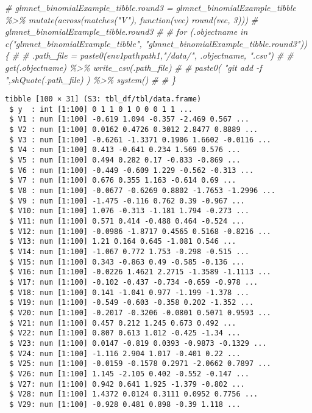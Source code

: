 \documentclass[
]{article}
\newenvironment{Shaded}{\begin{snugshade}}{\end{snugshade}}
\newcommand{\CommentTok}[1]{\textcolor[rgb]{0.56,0.35,0.01}{\textit{#1}}}
\begin{document}
\begin{Shaded}
\begin{Highlighting}[]
\CommentTok{\# glmnet\_binomialExample\_tibble.round3 = glmnet\_binomialExample\_tibble \%\textgreater{}\% mutate(across(matches("V"), function(vec) round(vec, 3)))}
\CommentTok{\# glmnet\_binomialExample\_tibble.round3}
\CommentTok{\# \# for (.objectname in c("glmnet\_binomialExample\_tibble", "glmnet\_binomialExample\_tibble.round3")) \{}
\CommentTok{\# \#     .path\_file = paste0(env1$path$path1,"/data/", .objectname, ".csv")}
\CommentTok{\# \#     get(.objectname) \%\textgreater{}\% write\_csv(.path\_file)}
\CommentTok{\# \#     paste0( "git add {-}f ",shQuote(.path\_file) ) \%\textgreater{}\% system()}
\CommentTok{\# \# \}}
\end{Highlighting}
\end{Shaded}

\begin{verbatim}
tibble [100 × 31] (S3: tbl_df/tbl/data.frame)
 $ y  : int [1:100] 0 1 1 0 1 0 0 0 1 1 ...
 $ V1 : num [1:100] -0.619 1.094 -0.357 -2.469 0.567 ...
 $ V2 : num [1:100] 0.0162 0.4726 0.3012 2.8477 0.8889 ...
 $ V3 : num [1:100] -0.6261 -1.3371 0.1906 1.6602 -0.0116 ...
 $ V4 : num [1:100] 0.413 -0.641 0.234 1.569 0.576 ...
 $ V5 : num [1:100] 0.494 0.282 0.17 -0.833 -0.869 ...
 $ V6 : num [1:100] -0.449 -0.609 1.229 -0.562 -0.313 ...
 $ V7 : num [1:100] 0.676 0.355 1.163 -0.614 0.69 ...
 $ V8 : num [1:100] -0.0677 -0.6269 0.8802 -1.7653 -1.2996 ...
 $ V9 : num [1:100] -1.475 -0.116 0.762 0.39 -0.967 ...
 $ V10: num [1:100] 1.076 -0.313 -1.181 1.794 -0.273 ...
 $ V11: num [1:100] 0.571 0.414 -0.488 0.464 -0.524 ...
 $ V12: num [1:100] -0.0986 -1.8717 0.4565 0.5168 -0.8216 ...
 $ V13: num [1:100] 1.21 0.164 0.645 -1.081 0.546 ...
 $ V14: num [1:100] -1.067 0.772 1.753 -0.298 -0.515 ...
 $ V15: num [1:100] 0.343 -0.863 0.49 -0.585 -0.136 ...
 $ V16: num [1:100] -0.0226 1.4621 2.2715 -1.3589 -1.1113 ...
 $ V17: num [1:100] -0.102 -0.437 -0.734 -0.659 -0.978 ...
 $ V18: num [1:100] 0.141 -1.041 0.977 -1.199 -1.378 ...
 $ V19: num [1:100] -0.549 -0.603 -0.358 0.202 -1.352 ...
 $ V20: num [1:100] -0.2017 -0.3206 -0.0801 0.5071 0.9593 ...
 $ V21: num [1:100] 0.457 0.212 1.245 0.673 0.492 ...
 $ V22: num [1:100] 0.807 0.613 1.012 -0.425 -1.34 ...
 $ V23: num [1:100] 0.0147 -0.819 0.0393 -0.9873 -0.1329 ...
 $ V24: num [1:100] -1.116 2.904 1.017 -0.401 0.22 ...
 $ V25: num [1:100] -0.0159 -0.1578 0.2971 -2.0662 0.7897 ...
 $ V26: num [1:100] 1.145 -2.105 0.402 -0.552 -0.147 ...
 $ V27: num [1:100] 0.942 0.641 1.925 -1.379 -0.802 ...
 $ V28: num [1:100] 1.4372 0.0124 0.3111 0.0952 0.7756 ...
 $ V29: num [1:100] -0.928 0.481 0.898 -0.39 1.118 ...

\end{verbatim}
\end{document}
